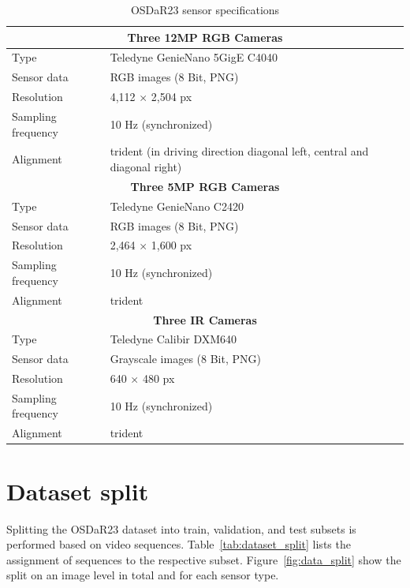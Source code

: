\documentclass[Master,MDS,english]{BASE/twbook} %
\begin{document}
\begin{table}[htbp]
  \centering
  \footnotesize
  \begin{tabular}{|l|l|}
    \hline
    \multicolumn{2}{|c|}{\textbf{Three 12MP RGB Cameras}}  \\
    \hline
    Type & Teledyne GenieNano 5GigE C4040  \\
    Sensor data & RGB images (8 Bit, PNG)  \\
    Resolution & 4,112 $\times$ 2,504 px  \\
    Sampling frequency & 10 Hz (synchronized)  \\
    Alignment & trident (in driving direction diagonal left, central and diagonal right)  \\
    \hline
    \multicolumn{2}{|c|}{\textbf{Three 5MP RGB Cameras}}  \\
    \hline
    Type & Teledyne GenieNano C2420  \\
    Sensor data & RGB images (8 Bit, PNG)  \\
    Resolution & 2,464 $\times$ 1,600 px \\
    Sampling frequency & 10 Hz (synchronized)  \\
    Alignment & trident  \\
    \hline
    \multicolumn{2}{|c|}{\textbf{Three IR Cameras}}  \\
    \hline
    Type & Teledyne Calibir DXM640  \\
    Sensor data & Grayscale images (8 Bit, PNG)  \\
    Resolution & 640 $\times$ 480 px  \\
    Sampling frequency & 10 Hz (synchronized)  \\
    Alignment & trident  \\
    \hline
  \end{tabular}
  \caption{OSDaR23 sensor specifications}
  \label{tab:cameras}
\end{table}



\section{Dataset split} \label{app:data_split}

Splitting the OSDaR23 dataset into train, validation, and test subsets is performed based on video sequences. Table~\ref{tab:dataset_split} lists the assignment of sequences to the respective subset. Figure~\ref{fig:data_split} show the split on an image level in total and for each sensor type.
\end{document}
